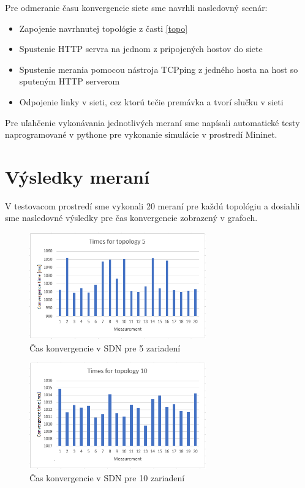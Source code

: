 \documentclass[conference]{IEEEtran}
\begin{document}
Pre odmeranie času konvergencie siete sme navrhli nasledovný scenár:

\begin{itemize}
	\item{Zapojenie navrhnutej topológie z časti \ref{topo}}
	\item{Spustenie HTTP servra na jednom z pripojených hostov do siete}
	\item{Spustenie merania pomocou nástroja TCPping z jedného hosta na host so sputeným HTTP serverom}
	\item{Odpojenie linky v sieti, cez ktorú tečie premávka a tvorí slučku v sieti}
\end{itemize}

Pre uľahčenie vykonávania jednotlivých meraní sme napísali automatické testy naprogramované v pythone pre vykonanie simulácie v prostredí Mininet. 

\section{Výsledky meraní}

V testovacom prostredí sme vykonali 20 meraní pre každú topológiu a dosiahli sme nasledovné výsledky pre čas konvergencie zobrazený v grafoch.

\begin{figure}[h!]
\centering
\includegraphics[width=3in]{../img/graph5}
\caption{Čas konvergencie v SDN pre 5 zariadení}
\end{figure}

\begin{figure}[h!]
\centering
\includegraphics[width=3in]{../img/graph10}
\caption{Čas konvergencie v SDN pre 10 zariadení}
\end{figure}
\end{document}
